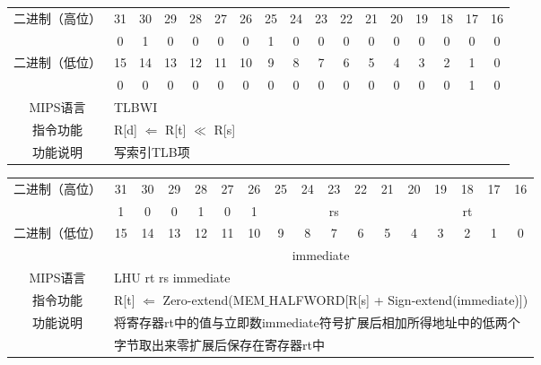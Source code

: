 \begin{table}
\begin{tabular}{|c|c|c|c|c|c|c|c|c|c|c|c|c|c|c|c|c|}
\hline
\multirow{2}{*}{二进制（高位）} &
31&30&29&28&27&26&25&24&23&22&21&20&19&18&17&16\\
\cline{2-17}
&
0&1&0&0&0&
0&1&0&0&0&
0&0&0&0&0&
0\\
\hline
\multirow{2}{*}{二进制（低位）} &
15&14&13&12&11&10&9&8&7&6&5&4&3&2&1&0\\
\cline{2-17}
&
0&0&0&0&0&
0&0&0&0&0&
0&0&0&0&1&
0\\
\hline
MIPS语言&
\multicolumn{16}{l|}{TLBWI}\\
\hline
指令功能&
\multicolumn{16}{l|}{R[d] $\Leftarrow$ R[t] $\ll$ R[s]}\\
\hline
功能说明&
\multicolumn{16}{l|}{写索引TLB项}\\
\hline
\end{tabular}
\end{table}

\begin{table}
\begin{tabular}{|c|c|c|c|c|c|c|c|c|c|c|c|c|c|c|c|c|}
\hline
\multirow{2}{*}{二进制（高位）} &
31&30&29&28&27&26&25&24&23&22&21&20&19&18&17&16\\
\cline{2-17}
&
1&0&0&1&0&
1&
\multicolumn{5}{c|}{rs}&
\multicolumn{5}{c|}{rt}\\
\hline
\multirow{2}{*}{二进制（低位）} &
15&14&13&12&11&10&9&8&7&6&5&4&3&2&1&0\\
\cline{2-17}
&
\multicolumn{16}{c|}{immediate}\\
\hline
MIPS语言&
\multicolumn{16}{l|}{LHU rt rs immediate}\\
\hline
指令功能&
\multicolumn{16}{l|}{R[t] $\Leftarrow$ Zero-extend(MEM$\_$HALFWORD[R[s] + Sign-extend(immediate)])}\\
\hline
\multirow{2}{*}{功能说明}&
\multicolumn{16}{l|}{将寄存器rt中的值与立即数immediate符号扩展后相加所得地址中的低两个}\\
&\multicolumn{16}{l|}{字节取出来零扩展后保存在寄存器rt中}\\
\hline
\end{tabular}
\end{table}
